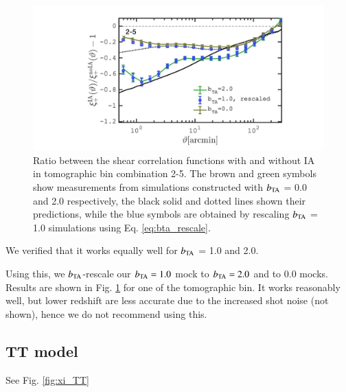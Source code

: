 \documentclass[useAMS,usenatbib]{mn2e}
\begin{document}
\begin{figure}
\includegraphics[width=\columnwidth]{graphs/frac_xip_bta1_rescaled}
\caption{Ratio between the shear correlation functions with and without IA in tomographic bin combination 2-5. The brown and green symbols show measurements from simulations constructed with $b_{\rm TA}$ = 0.0 and 2.0 respectively,  the black solid and dotted lines shown their predictions, while the blue symbols are obtained by rescaling $b_{\rm TA}$ = 1.0 simulations using Eq. \ref{eq:bta_rescale}.  }
\label{fig:xi_deltaNLA_rescaled}
\end{figure}


We verified that it works equally well for $b_{\rm TA}$ = 1.0 and 2.0.


Using this, we $b_{\rm TA}$-rescale our $b_{\rm TA}=1.0$ mock to $b_{\rm TA}=2.0$ and to $0.0$ mocks. Results are shown in Fig. \ref{fig:xi_deltaNLA_rescaled} for one of the tomographic bin. It works reasonably well, but lower redshift are less accurate due to the increased  shot noise (not shown), hence we do not recommend using this.

\subsection{TT model}
\label{subsec:TT}

See Fig. \ref{fig:xi_TT}
\end{document}
